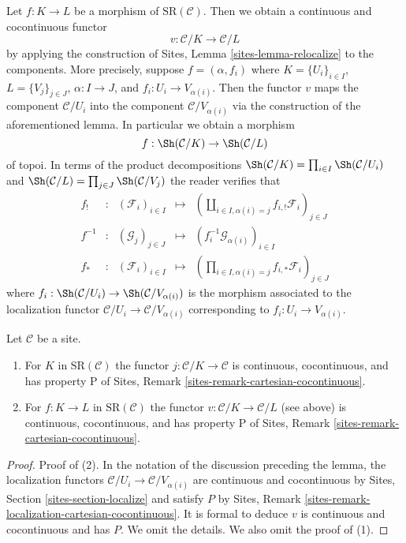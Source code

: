 \medskip\noindent
Let $f : K \to L$ be a morphism of $\text{SR}(\mathcal{C})$.
Then we obtain a continuous and cocontinuous functor
$$
v : \mathcal{C}/K \longrightarrow \mathcal{C}/L
$$
by applying the construction of Sites, Lemma \ref{sites-lemma-relocalize}
to the components. More precisely, suppose $f = (\alpha, f_i)$
where $K = \{U_i\}_{i \in I}$, $L = \{V_j\}_{j \in J}$, $\alpha : I \to J$,
and $f_i : U_i \to V_{\alpha(i)}$. Then the functor $v$ maps the component
$\mathcal{C}/U_i$ into the component $\mathcal{C}/V_{\alpha(i)}$
via the construction of the aforementioned lemma. In particular
we obtain a morphism
$$
f : \Sh(\mathcal{C}/K) \to \Sh(\mathcal{C}/L)
$$
of topoi. In terms of the product decompositions
$\Sh(\mathcal{C}/K) = \prod\nolimits_{i \in I} \Sh(\mathcal{C}/U_i)$ and
$\Sh(\mathcal{C}/L) = \prod\nolimits_{j \in J} \Sh(\mathcal{C}/V_j)$
the reader verifies that
$$
\begin{matrix}
f_! & : &
(\mathcal{F}_i)_{i \in I} &
\longmapsto &
(\coprod\nolimits_{i \in I, \alpha(i) = j} f_{i, !}\mathcal{F}_i)_{j \in J} \\
f^{-1} & : &
(\mathcal{G}_j)_{j \in J} &
\longmapsto &
(f_i^{-1}\mathcal{G}_{\alpha(i)})_{i \in I} \\
f_* & : &
(\mathcal{F}_i)_{i \in I} &
\longmapsto &
(\prod\nolimits_{i \in I, \alpha(i) = j} f_{i, *}\mathcal{F}_i)_{j \in J}
\end{matrix}
$$
where $f_i : \Sh(\mathcal{C}/U_i) \to \Sh(\mathcal{C}/V_{\alpha(i)})$
is the morphism associated to the localization functor
$\mathcal{C}/U_i \to \mathcal{C}/V_{\alpha(i)}$ corresponding to
$f_i : U_i \to V_{\alpha(i)}$.

\begin{lemma}
\label{lemma-has-P}
Let $\mathcal{C}$ be a site.
\begin{enumerate}
\item For $K$ in $\text{SR}(\mathcal{C})$ the functor
$j : \mathcal{C}/K \to \mathcal{C}$ is continuous,
cocontinuous, and has property P of
Sites, Remark \ref{sites-remark-cartesian-cocontinuous}.
\item For $f : K \to L$ in $\text{SR}(\mathcal{C})$
the functor $v : \mathcal{C}/K \to \mathcal{C}/L$ (see above)
is continuous, cocontinuous, and has property P of
Sites, Remark \ref{sites-remark-cartesian-cocontinuous}.
\end{enumerate}
\end{lemma}

\begin{proof}
Proof of (2). In the notation of the discussion preceding the lemma,
the localization functors $\mathcal{C}/U_i \to \mathcal{C}/V_{\alpha(i)}$
are continuous and cocontinuous by
Sites, Section \ref{sites-section-localize}
and satisfy $P$ by
Sites, Remark \ref{sites-remark-localization-cartesian-cocontinuous}.
It is formal to deduce $v$ is continuous and cocontinuous and has $P$.
We omit the details. We also omit the proof of (1).
\end{proof}

